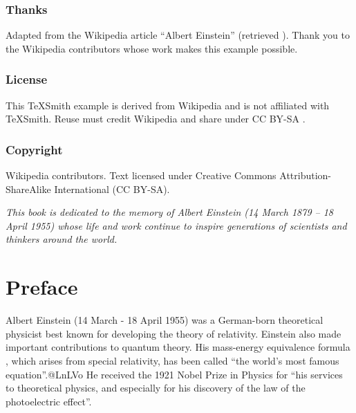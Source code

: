 \documentclass[twoside]{memoir}
\title{\Huge\bfseries\booktitle}
\author{\bookauthor}
\begin{document}
\hypersetup{pageanchor=false}
\frontmatter
\maketitle
\thispagestyle{empty}
\cleardoublepage
\thispagestyle{plain}
\subsection*{Thanks}
Adapted from the Wikipedia article ``Albert Einstein'' (retrieved ).
Thank you to the Wikipedia contributors whose work makes this example possible.
\subsection*{License}
This TeXSmith example is derived from Wikipedia and is not affiliated with TeXSmith.
Reuse must credit Wikipedia and share under CC BY-SA .
\subsection*{Copyright}
Wikipedia contributors. Text licensed under Creative Commons Attribution-ShareAlike
International (CC BY-SA).

\cleardoublepage
\thispagestyle{plain}
\begin{center}
\vspace*{3cm}
{\Large\itshape This book is dedicated to the memory of Albert Einstein
\vspace{1em}
(14 March 1879 -- 18 April 1955)
\vspace{1em}
whose life and work continue to inspire generations of scientists and thinkers around the world.
}
\end{center}
\thispagestyle{empty}
\raggedbottom

\cleardoublepage
\thispagestyle{plain}
\begingroup
{}
\chapter*{Preface}
Albert Einstein (14 March - 18 April 1955) was a German-born theoretical physicist best known for developing the theory of relativity. Einstein also made important contributions to quantum theory. His mass-energy equivalence formula , which arises from special relativity, has been called \enquote{the world's most famous equation}.@LnLVo He received the 1921 Nobel Prize in Physics for \enquote{his services to theoretical physics, and especially for his discovery of the law of the photoelectric effect}.
\end{document}

